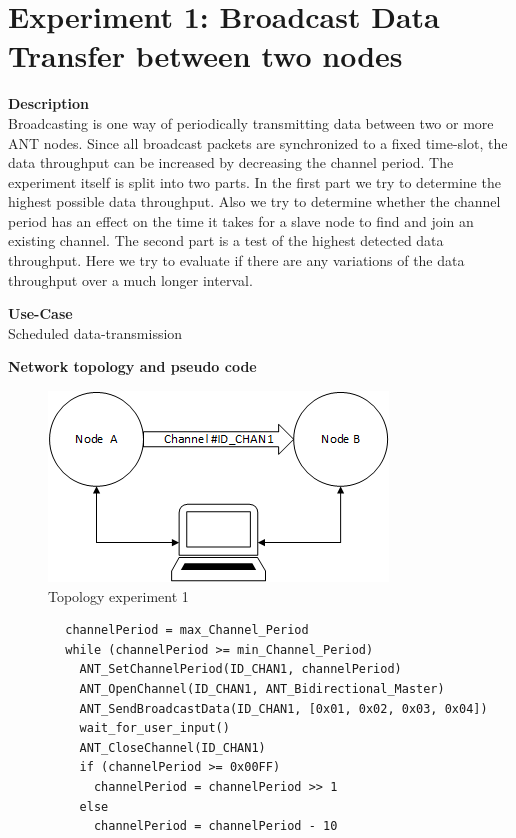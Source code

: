 \section{Experiment 1: Broadcast Data Transfer between two nodes}
\begin{description} 
	\item{\textbf{Description}} \hfill \\ Broadcasting is one way of periodically transmitting data between two or more ANT nodes. Since all broadcast packets are synchronized to a fixed time-slot, the data throughput can be increased by decreasing the channel period. The experiment itself is split into two parts. In the first part we try to determine the highest possible data throughput. Also we try to determine whether the channel period has an effect on the time it takes for a slave node to find and join an existing channel. The second part is a test of the highest detected data throughput. Here we try to evaluate if there are any variations of the data throughput over a much longer interval.	
	\item{\textbf{Use-Case}} \hfill \\ Scheduled data-transmission	
	\item{\textbf{Network topology and pseudo code}} \hfill \\ 
	\begin{figure}[H]
		\centering
		\includegraphics[scale=1]{content/images/exp_topo.png}
		\caption{Topology experiment 1}
	\end{figure}
	\begin{code}[H]
		\begin{verbatim}
		channelPeriod = max_Channel_Period
		while (channelPeriod >= min_Channel_Period)
		  ANT_SetChannelPeriod(ID_CHAN1, channelPeriod)
		  ANT_OpenChannel(ID_CHAN1, ANT_Bidirectional_Master)
		  ANT_SendBroadcastData(ID_CHAN1, [0x01, 0x02, 0x03, 0x04])
		  wait_for_user_input()
		  ANT_CloseChannel(ID_CHAN1)
		  if (channelPeriod >= 0x00FF)
		    channelPeriod = channelPeriod >> 1
		  else
		    channelPeriod = channelPeriod - 10
		\end{verbatim}
		\caption{Broadcast data single channel (Master)}\label{lst:mExp1}
	\end{code}
	

\end{description}
